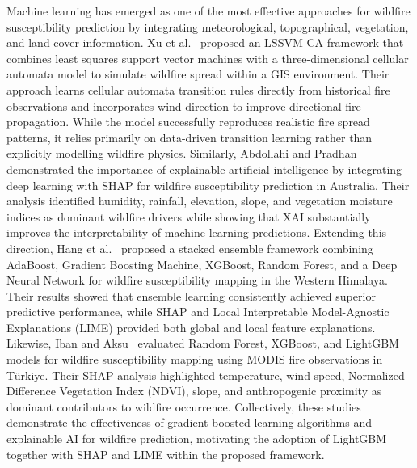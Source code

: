 \documentclass{ieeeaccess}
\begin{document}
Machine learning has emerged as one of the most effective approaches for wildfire susceptibility prediction by integrating meteorological, topographical, vegetation, and land-cover information. Xu et al.~\cite{1} proposed an LSSVM-CA framework that combines least squares support vector machines with a three-dimensional cellular automata model to simulate wildfire spread within a GIS environment. Their approach learns cellular automata transition rules directly from historical fire observations and incorporates wind direction to improve directional fire propagation. While the model successfully reproduces realistic fire spread patterns, it relies primarily on data-driven transition learning rather than explicitly modelling wildfire physics. Similarly, Abdollahi and Pradhan~\cite{2} demonstrated the importance of explainable artificial intelligence by integrating deep learning with SHAP for wildfire susceptibility prediction in Australia. Their analysis identified humidity, rainfall, elevation, slope, and vegetation moisture indices as dominant wildfire drivers while showing that XAI substantially improves the interpretability of machine learning predictions. Extending this direction, Hang et al.~\cite{3} proposed a stacked ensemble framework combining AdaBoost, Gradient Boosting Machine, XGBoost, Random Forest, and a Deep Neural Network for wildfire susceptibility mapping in the Western Himalaya. Their results showed that ensemble learning consistently achieved superior predictive performance, while SHAP and Local Interpretable Model-Agnostic Explanations (LIME) provided both global and local feature explanations. Likewise, Iban and Aksu~\cite{4} evaluated Random Forest, XGBoost, and LightGBM models for wildfire susceptibility mapping using MODIS fire observations in Türkiye. Their SHAP analysis highlighted temperature, wind speed, Normalized Difference Vegetation Index (NDVI), slope, and anthropogenic proximity as dominant contributors to wildfire occurrence. Collectively, these studies demonstrate the effectiveness of gradient-boosted learning algorithms and explainable AI for wildfire prediction, motivating the adoption of LightGBM together with SHAP and LIME within the proposed framework.
\end{document}
